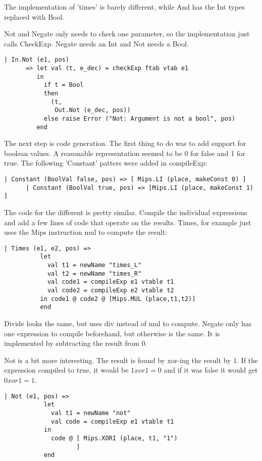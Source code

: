 \documentclass[10pt]{article}
\begin{document}
The implementation of 'times' is barely different, while And has the Int types replaced with Bool. 

Not and Negate only needs to check one parameter, so the implementation just calls CheckExp. Negate needs an Int and Not needs a Bool.

\begin{Verbatim}[frame=single]
   | In.Not (e1, pos)
      => let val (t, e_dec) = checkExp ftab vtab e1
         in
           if t = Bool
           then
             (t,
              Out.Not (e_dec, pos))
           else raise Error ("Not: Argument is not a bool", pos)
         end
\end{Verbatim}

The next step is  code generation. The first thing to do was to add support for boolean values. A reasonable representation seemed to be 0 for false and 
1 for true. The following 'Constant' patters were added in compileExp:

\begin{Verbatim}[frame=single]
      | Constant (BoolVal false, pos) => [ Mips.LI (place, makeConst 0) ] 
      | Constant (BoolVal true, pos) => [Mips.LI (place, makeConst 1) ] 
\end{Verbatim}

The code for the different is pretty similar. Compile the individual expressions and add a few lines of code that operate on the results. Times, for example just uses the Mips instruction mul to compute the result:

\begin{Verbatim}[frame=single]
      | Times (e1, e2, pos) =>
          let
            val t1 = newName "times_L"
            val t2 = newName "times_R"
            val code1 = compileExp e1 vtable t1
            val code2 = compileExp e2 vtable t2
          in code1 @ code2 @ [Mips.MUL (place,t1,t2)]
          end
\end{Verbatim}

Divide looks the same, but uses div instead of mul to compute. Negate only has one expression to compile beforehand, but otherwise is the same. It is implemented by subtracting the result from 0.

Not is a bit more interesting. The result is found by xor-ing the result by 1. If the expression compiled to true, it would be $1 xor 1 = 0$ and if it was false it would get $0 xor 1 = 1$.

\begin{Verbatim}[frame=single]
       | Not (e1, pos) =>
           let
             val t1 = newName "not"
             val code = compileExp e1 vtable t1
           in
             code @ [ Mips.XORI (place, t1, "1")
                    ]
           end
\end{Verbatim}
\end{document}
